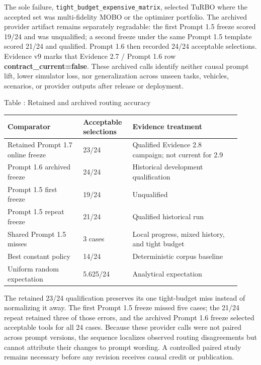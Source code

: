 The sole failure, \texttt{tight\_budget\_expensive\_matrix}, selected
TuRBO where the accepted set was multi-fidelity MOBO or the optimizer
portfolio. The archived provider artifact remains separately regradable:
the first Prompt 1.5 freeze scored 19/24 and was unqualified; a second
freeze under the same Prompt 1.5 template scored 21/24 and qualified.
Prompt 1.6 then recorded 24/24 acceptable selections. Evidence v9 marks
that Evidence 2.7 / Prompt 1.6 row
\textbf{contract\_current=false}. These archived calls identify neither
causal prompt lift, lower simulator loss, nor generalization across unseen
tasks, vehicles, scenarios, or provider outputs after release or
deployment.

\begin{center}
\begingroup
{}\textnormal{Table \thetable: Retained and archived routing accuracy}\par
\vspace{0.22em}
\small
\renewcommand{\arraystretch}{0.92}
\begin{tabular}{@{}L{0.30\linewidth}C{0.19\linewidth}L{0.43\linewidth}@{}}
\toprule
\textbf{Comparator} & \textbf{Acceptable selections} & \textbf{Evidence
treatment}\tabularnewline
\midrule
Retained Prompt 1.7 online freeze & 23/24 & Qualified Evidence 2.8
campaign; not current for 2.9\tabularnewline
Prompt 1.6 archived freeze & 24/24 & Historical development
qualification\tabularnewline
Prompt 1.5 first freeze & 19/24 & Unqualified\tabularnewline
Prompt 1.5 repeat freeze & 21/24 & Qualified historical
run\tabularnewline
Shared Prompt 1.5 misses & 3 cases & Local progress, mixed history, and
tight budget\tabularnewline
Best constant policy & 14/24 & Deterministic corpus
baseline\tabularnewline
Uniform random expectation & 5.625/24 & Analytical
expectation\tabularnewline
\bottomrule
\end{tabular}
\endgroup
\end{center}

The retained 23/24 qualification preserves its one
tight-budget miss instead of normalizing it away. The first Prompt 1.5
freeze missed five cases; the 21/24 repeat retained three of those errors,
and the archived Prompt 1.6 freeze selected acceptable tools for all 24
cases. Because these provider calls were not paired across prompt versions,
the sequence localizes observed routing disagreements but cannot attribute
their changes to prompt wording. A controlled paired study remains
necessary before any revision receives causal credit or publication.

